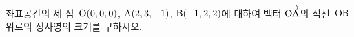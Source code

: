 좌표공간의 세 점~$\mathrm{O}(0{,}\mkern3mu\mathopen{}0{,}\mkern3mu\mathopen{}0)$, $\mathrm{A}(2{,}\mkern3mu\mathopen{}3{,}\mkern3mu\mathopen{}-1)$, $\mathrm{B}(-1{,}\mkern3mu\mathopen{}2{,}\mkern3mu\mathopen{}2)$에 대하여 벡터 $\overrightarrow{\mathrm{OA}}$의 직선~$\mathrm{OB}$ 위로의 정사영의 크기를 구하시오.
